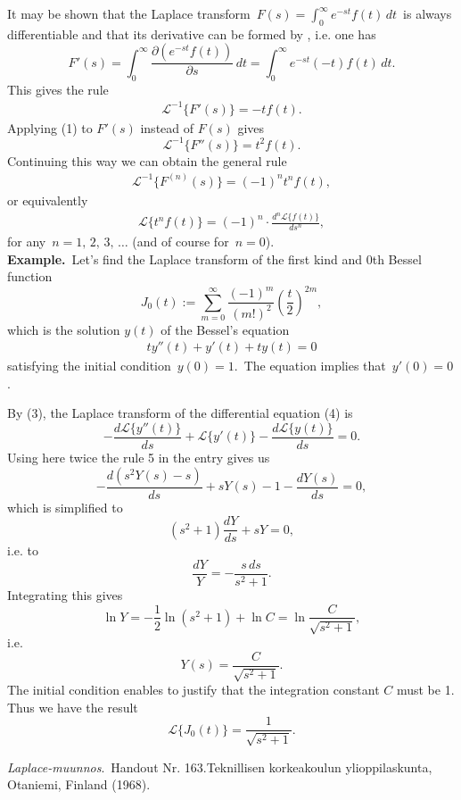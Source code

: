 \documentclass[12pt]{article}
\theoremstyle{definition}
\begin{document}
It may be shown that the Laplace transform \,$F(s) = 
\int _0^\infty e^{-st}f(t)\,dt$\, is always differentiable and that its derivative can be formed by , i.e. one has
 $$F'(s) = \int_0^\infty\frac{\partial(e^{-st}f(t))}{\partial s}\,dt = 
\int_0^\infty e^{-st}(-t)f(t)\,dt.$$
This gives the rule
\begin{align}
    \mathcal{L}^{-1}\{F'(s)\} = -tf(t).
\end{align}
Applying (1) to $F'(s)$ instead of $F(s)$ gives
     $$\mathcal{L}^{-1}\{F''(s)\} = t^2f(t).$$
Continuing this way we can obtain the general rule
\begin{align}
    \mathcal{L}^{-1}\{F^{(n)}(s)\} = (-1)^nt^nf(t),
\end{align}
or equivalently
\begin{align}
 \mathcal{L}\{t^nf(t)\} = (-1)^n\cdot\frac{d^n\mathcal{L}\{f(t)\}}{ds^n},
\end{align}
for any\, $n = 1,\,2,\,3,\,\ldots$ (and of course for\, $n = 0$).\\

\textbf{Example.}\, Let's find the Laplace transform of the first kind and 0th  Bessel function 
$$ J_{0}(t) := 
\sum_{m=0}^\infty \frac{(-1)^m}{(m!)^2}\left(\frac{t}{2}\right)^{2m},
$$
which is the solution $y(t)$ of the Bessel's equation 
\begin{align}
    ty''(t)+y'(t)+ty(t) = 0
\end{align}
satisfying the initial condition\, $y(0) = 1$.\, The equation implies that\, $y'(0) = 0$.

By (3), the Laplace transform of the differential equation (4) is
$$-\frac{d\mathcal{L}\{y''(t)\}}{ds}+\mathcal{L}\{y'(t)\}
-\frac{d\mathcal{L}\{y(t)\}}{ds} = 0.$$
Using here twice the rule 5 in the  entry gives us
$$-\frac{d(s^2Y(s)-s)}{ds}+sY(s)-1-\frac{dY(s)}{ds} = 0,$$
which is simplified to
$$(s^2+1)\frac{dY}{ds}+sY = 0,$$
i.e. to
$$\frac{dY}{Y} = -\frac{s\,ds}{s^2+1}.$$
Integrating this gives  
$$\ln Y = -\frac{1}{2}\ln(s^2+1)+\ln C = \ln\frac{C}{\sqrt{s^2+1}},$$
i.e.
   $$Y(s) = \frac{C}{\sqrt{s^2+1}}.$$
The initial condition enables to justify that the integration constant $C$ must be 1.\, Thus we have the result
$$\mathcal{L}\{J_0(t)\} = \frac{1}{\sqrt{s^2+1}}.$$ 


\begin{thebibliography}{9}
 {\em Laplace-muunnos}.\, Handout Nr. 163.\quad Teknillisen korkeakoulun ylioppilaskunta, Otaniemi, Finland (1968).
\end{thebibliography}

\end{document}

